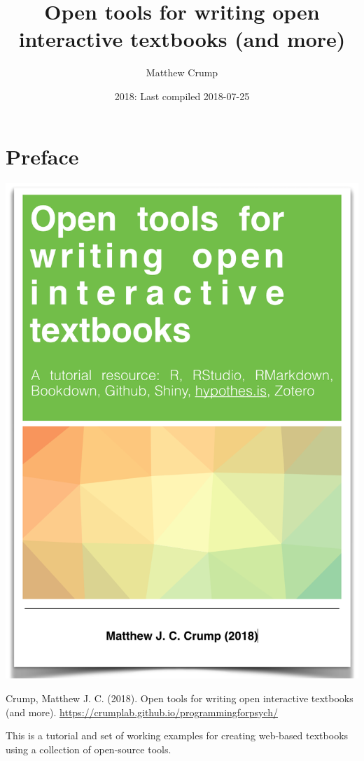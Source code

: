 \documentclass[]{book}
\title{Open tools for writing open interactive textbooks (and more)}
\author{Matthew Crump}
\date{2018: Last compiled 2018-07-25}
\theoremstyle{definition}
\theoremstyle{definition}
\theoremstyle{definition}
\theoremstyle{remark}
\begin{document}
\maketitle

{
\setcounter{tocdepth}{1}
\tableofcontents
}
\chapter*{Preface}\label{preface}

\begin{center}\includegraphics[width=12.61in]{OER} \end{center}

Crump, Matthew J. C. (2018). Open tools for writing open interactive
textbooks (and more).
\url{https://crumplab.github.io/programmingforpsych/}

This is a tutorial and set of working examples for creating web-based
textbooks using a collection of open-source tools.
\end{document}
